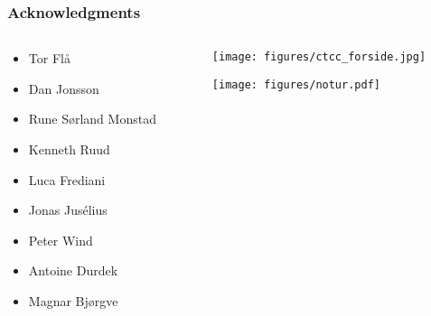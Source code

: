 \begin{frame}
    \frametitle{Acknowledgments}
    \large
    \begin{columns}
    \begin{column}[b]{0.5\linewidth}
    \begin{itemize}
    	\item Tor Fl{\aa}
    	\item Dan Jonsson
    	\item Rune S{\o}rland Monstad
        \item Kenneth Ruud
	\item Luca Frediani
    \end{itemize}

    \vspace{5mm}

    \begin{itemize}
    	\item Jonas Jus{\'e}lius
    	\item Peter Wind
	\item Antoine Durdek
    	\item Magnar Bj{\o}rgve
    \end{itemize}

    \vspace{5mm}

    \end{column}
    \begin{column}[b]{0.5\linewidth}
	\centering
	\texttt{[image: figures/ctcc\_forside.jpg]}\\

        \vspace{10mm}

	\texttt{[image: figures/notur.pdf]}

        \vspace{20mm}

    \end{column}
    \end{columns}
\end{frame}

